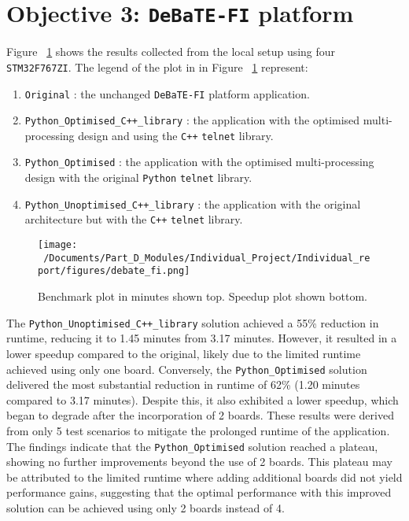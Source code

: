 \section{Objective 3: \texttt{DeBaTE-FI} platform}

Figure ~\ref{fig:debate_fi_plot} shows the results collected from the local setup using four \texttt{STM32F767ZI}. The legend of the plot in in Figure ~\ref{fig:debate_fi_plot} represent:

\begin{enumerate}
	\item \texttt{Original} : the unchanged \texttt{DeBaTE-FI} platform application. 
	\item \texttt{Python\_Optimised\_C++\_library} : the application with the optimised multi-processing design and using the \texttt{C++} \texttt{telnet} library.
	\item \texttt{Python\_Optimised} : the application with the optimised multi-processing design with the original \texttt{Python} \texttt{telnet} library.
	\item \texttt{Python\_Unoptimised\_C++\_library} : the application with the original architecture but with the \texttt{C++} \texttt{telnet} library.
\end{enumerate}

\begin{figure}[htbp] %
	\centering
	\texttt{[image: ~/Documents/Part\_D\_Modules/Individual\_Project/Individual\_report/figures/debate\_fi.png]} %
	\caption{Benchmark plot in minutes shown top. Speedup plot shown bottom.}
	\label{fig:debate_fi_plot} %
\end{figure}

The \texttt{Python\_Unoptimised\_C++\_library} solution achieved a 55\% reduction in runtime, reducing it to 1.45 minutes from 3.17 minutes. However, it resulted in a lower speedup compared to the original, likely due to the limited runtime achieved using only one board. Conversely, the \texttt{Python\_Optimised} solution delivered the most substantial reduction in runtime of 62\% (1.20 minutes compared to 3.17 minutes). Despite this, it also exhibited a lower speedup, which began to degrade after the incorporation of 2 boards. These results were derived from only 5 test scenarios to mitigate the prolonged runtime of the application. The findings indicate that the \texttt{Python\_Optimised} solution reached a plateau, showing no further improvements beyond the use of 2 boards. This plateau may be attributed to the limited runtime where adding additional boards did not yield performance gains, suggesting that the optimal performance with this improved solution can be achieved using only 2 boards instead of 4.

